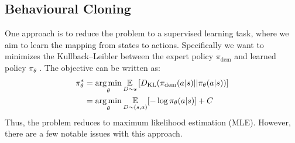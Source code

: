 \subsection{Behavioural Cloning}
One approach is to reduce the problem to a supervised learning task, where we aim to learn 
the mapping from states to actions. Specifically we want to minimizes the Kullback–Leibler between the expert policy  
 $\pi_\text{dem}$ and learned policy $\pi_\theta$ . The objective can be written as:
\begin{align*}
    \pi_\theta^* &= \operatorname*{arg\,min}\limits_\theta \underset{D\sim s}{\mathbb{E}}\left[D_{\text{KL}}(\pi_{\text{dem}}(a|s)|| \pi_\theta(a|s))\right] \\
    &= \operatorname*{arg\,min}\limits_\theta \underset{D\sim(s,a)}{\mathbb{E}}[-\log{\pi_\theta(a|s)}]+C
\end{align*}
Thus, the problem reduces to maximum likelihood estimation (MLE). However, there are a few notable issues with this approach.

